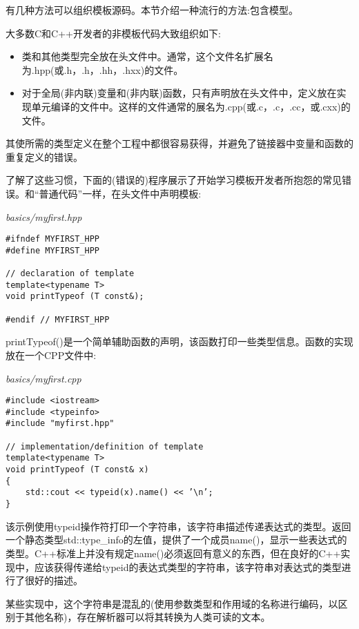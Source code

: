 

有几种方法可以组织模板源码。本节介绍一种流行的方法:包含模型。


大多数C和C++开发者的非模板代码大致组织如下:

\begin{itemize}
\item
类和其他类型完全放在头文件中。通常，这个文件名扩展名为.hpp(或.h，.h，.hh，.hxx)的文件。

\item
对于全局(非内联)变量和(非内联)函数，只有声明放在头文件中，定义放在实现单元编译的文件中。这样的文件通常的展名为.cpp(或.c，.c，.cc，或.cxx)的文件。
\end{itemize}

其使所需的类型定义在整个工程中都很容易获得，并避免了链接器中变量和函数的重复定义的错误。

了解了这些习惯，下面的(错误的)程序展示了开始学习模板开发者所抱怨的常见错误。和“普通代码”一样，在头文件中声明模板:

\noindent
\textit{basics/myfirst.hpp}
\begin{lstlisting}[style=styleCXX]
#ifndef MYFIRST_HPP
#define MYFIRST_HPP

// declaration of template
template<typename T>
void printTypeof (T const&);

#endif // MYFIRST_HPP
\end{lstlisting}

printTypeof()是一个简单辅助函数的声明，该函数打印一些类型信息。函数的实现放在一个CPP文件中:

\noindent
\textit{basics/myfirst.cpp}
\begin{lstlisting}[style=styleCXX]
#include <iostream>
#include <typeinfo>
#include "myfirst.hpp"

// implementation/definition of template
template<typename T>
void printTypeof (T const& x)
{
	std::cout << typeid(x).name() << ’\n’;
}
\end{lstlisting}

该示例使用typeid操作符打印一个字符串，该字符串描述传递表达式的类型。返回一个静态类型std::type\_info的左值，提供了一个成员name()，显示一些表达式的类型。C++标准上并没有规定name()必须返回有意义的东西，但在良好的C++实现中，应该获得传递给typeid的表达式类型的字符串，该字符串对表达式的类型进行了很好的描述。
 
\begin{tcolorbox}[colback=webgreen!5!white,colframe=webgreen!75!black]
\hspace*{0.75cm}某些实现中，这个字符串是混乱的(使用参数类型和作用域的名称进行编码，以区别于其他名称)，存在解析器可以将其转换为人类可读的文本。
\end{tcolorbox}


